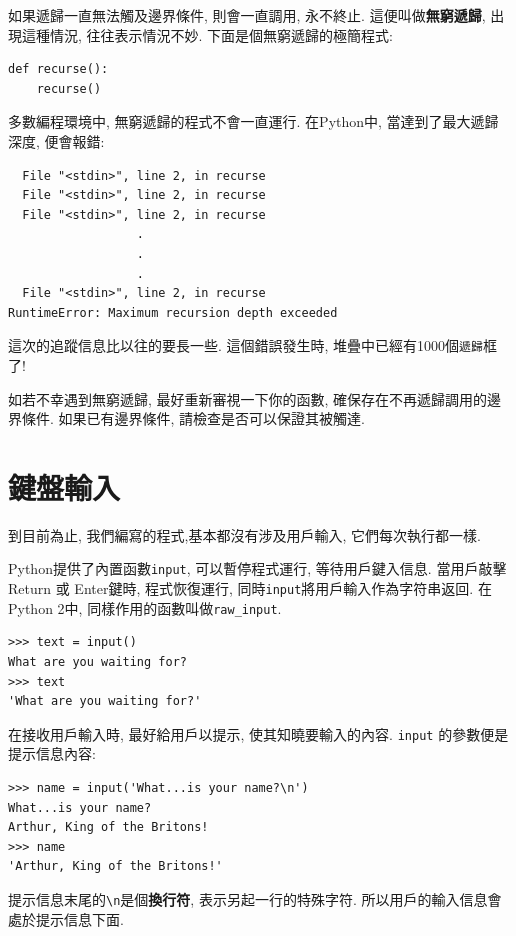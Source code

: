 \documentclass[10pt]{book}
\begin{document}
如果遞歸一直無法觸及邊界條件, 則會一直調用, 永不終止. 
這便叫做{\bf 無窮遞歸}, 出現這種情況, 往往表示情況不妙. 
下面是個無窮遞歸的極簡程式:

\begin{verbatim}
def recurse():
    recurse()
\end{verbatim}
%
多數編程環境中, 無窮遞歸的程式不會一直運行. 
在Python中, 當達到了最大遞歸深度, 便會報錯:

\begin{verbatim}
  File "<stdin>", line 2, in recurse
  File "<stdin>", line 2, in recurse
  File "<stdin>", line 2, in recurse
                  .   
                  .
                  .
  File "<stdin>", line 2, in recurse
RuntimeError: Maximum recursion depth exceeded
\end{verbatim}
%
這次的追蹤信息比以往的要長一些. 這個錯誤發生時, 堆疊中已經有1000個{\tt 遞歸}框了!

如若不幸遇到無窮遞歸, 最好重新審視一下你的函數, 確保存在不再遞歸調用的邊界條件. 
如果已有邊界條件, 請檢查是否可以保證其被觸達. 


\section{鍵盤輸入}

到目前為止, 我們編寫的程式,基本都沒有涉及用戶輸入, 它們每次執行都一樣. 

Python提供了內置函數{\tt input},  可以暫停程式運行, 等待用戶鍵入信息. 
當用戶敲擊{\sf  Return} 或 {\sf Enter}鍵時, 程式恢復運行, 
同時\verb"input"將用戶輸入作為字符串返回. 
在Python 2中, 同樣作用的函數叫做\verb"raw_input".

\begin{verbatim}
>>> text = input()
What are you waiting for?
>>> text
'What are you waiting for?'
\end{verbatim}
%
在接收用戶輸入時, 最好給用戶以提示, 使其知曉要輸入的內容. 
 \verb"input" 的參數便是提示信息內容:

\begin{verbatim}
>>> name = input('What...is your name?\n')
What...is your name?
Arthur, King of the Britons!
>>> name
'Arthur, King of the Britons!'
\end{verbatim}
%
提示信息末尾的\verb"\n"是個{\bf 換行符},  表示另起一行的特殊字符. 
所以用戶的輸入信息會處於提示信息下面.  
\end{document}
